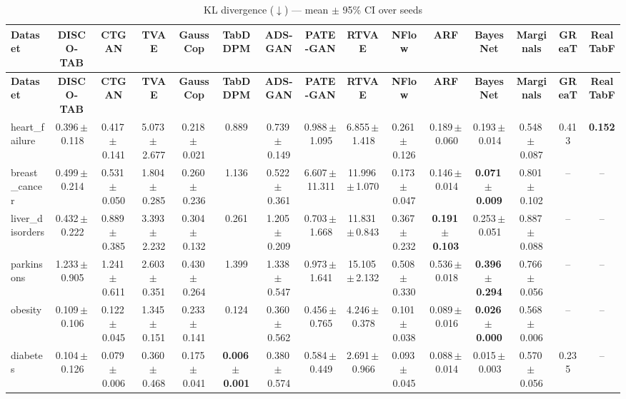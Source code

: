 \documentclass[8pt]{extarticle}
\begin{document}
\begin{longtable}{l*{14}{c}}
\caption{KL divergence ($\downarrow$) --- mean $\pm$ 95\% CI over seeds}\\
\toprule
\textbf{Dataset} & \textbf{DISCO-TAB} & \textbf{CTGAN} & \textbf{TVAE} & \textbf{GaussCop} & \textbf{TabDDPM} & \textbf{ADS-GAN} & \textbf{PATE-GAN} & \textbf{RTVAE} & \textbf{NFlow} & \textbf{ARF} & \textbf{BayesNet} & \textbf{Marginals} & \textbf{GReaT} & \textbf{RealTabF} \\
\midrule
\endfirsthead
\toprule
\textbf{Dataset} & \textbf{DISCO-TAB} & \textbf{CTGAN} & \textbf{TVAE} & \textbf{GaussCop} & \textbf{TabDDPM} & \textbf{ADS-GAN} & \textbf{PATE-GAN} & \textbf{RTVAE} & \textbf{NFlow} & \textbf{ARF} & \textbf{BayesNet} & \textbf{Marginals} & \textbf{GReaT} & \textbf{RealTabF} \\
\midrule
\endhead
\bottomrule
\endfoot
heart\_failure & 0.396\,$\pm$\,0.118 & 0.417\,$\pm$\,0.141 & 5.073\,$\pm$\,2.677 & 0.218\,$\pm$\,0.021 & 0.889 & 0.739\,$\pm$\,0.149 & 0.988\,$\pm$\,1.095 & 6.855\,$\pm$\,1.418 & 0.261\,$\pm$\,0.126 & 0.189\,$\pm$\,0.060 & 0.193\,$\pm$\,0.014 & 0.548\,$\pm$\,0.087 & 0.413 & \textbf{0.152} \\
breast\_cancer & 0.499\,$\pm$\,0.214 & 0.531\,$\pm$\,0.050 & 1.804\,$\pm$\,0.285 & 0.260\,$\pm$\,0.236 & 1.136 & 0.522\,$\pm$\,0.361 & 6.607\,$\pm$\,11.311 & 11.996\,$\pm$\,1.070 & 0.173\,$\pm$\,0.047 & 0.146\,$\pm$\,0.014 & \textbf{0.071\,$\pm$\,0.009} & 0.801\,$\pm$\,0.102 & -- & -- \\
liver\_disorders & 0.432\,$\pm$\,0.222 & 0.889\,$\pm$\,0.385 & 3.393\,$\pm$\,2.232 & 0.304\,$\pm$\,0.132 & 0.261 & 1.205\,$\pm$\,0.209 & 0.703\,$\pm$\,1.668 & 11.831\,$\pm$\,0.843 & 0.367\,$\pm$\,0.232 & \textbf{0.191\,$\pm$\,0.103} & 0.253\,$\pm$\,0.051 & 0.887\,$\pm$\,0.088 & -- & -- \\
parkinsons & 1.233\,$\pm$\,0.905 & 1.241\,$\pm$\,0.611 & 2.603\,$\pm$\,0.351 & 0.430\,$\pm$\,0.264 & 1.399 & 1.338\,$\pm$\,0.547 & 0.973\,$\pm$\,1.641 & 15.105\,$\pm$\,2.132 & 0.508\,$\pm$\,0.330 & 0.536\,$\pm$\,0.018 & \textbf{0.396\,$\pm$\,0.294} & 0.766\,$\pm$\,0.056 & -- & -- \\
obesity & 0.109\,$\pm$\,0.106 & 0.122\,$\pm$\,0.045 & 1.345\,$\pm$\,0.151 & 0.233\,$\pm$\,0.141 & 0.124 & 0.360\,$\pm$\,0.562 & 0.456\,$\pm$\,0.765 & 4.246\,$\pm$\,0.378 & 0.101\,$\pm$\,0.038 & 0.089\,$\pm$\,0.016 & \textbf{0.026\,$\pm$\,0.000} & 0.568\,$\pm$\,0.006 & -- & -- \\
diabetes & 0.104\,$\pm$\,0.126 & 0.079\,$\pm$\,0.006 & 0.360\,$\pm$\,0.468 & 0.175\,$\pm$\,0.041 & \textbf{0.006\,$\pm$\,0.001} & 0.380\,$\pm$\,0.574 & 0.584\,$\pm$\,0.449 & 2.691\,$\pm$\,0.966 & 0.093\,$\pm$\,0.045 & 0.088\,$\pm$\,0.014 & 0.015\,$\pm$\,0.003 & 0.570\,$\pm$\,0.056 & 0.235 & -- \\

\end{longtable}
\end{document}
